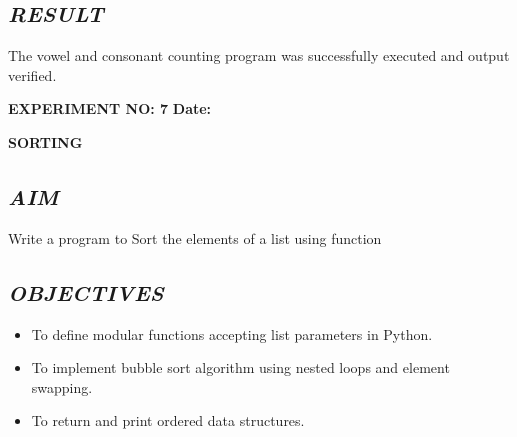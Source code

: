 \documentclass[11pt,a4paper]{article}
\begin{document}
\subsection*{\textit{RESULT}}
The vowel and consonant counting program was successfully executed and output verified.

\newpage

\noindent
\textbf{\large EXPERIMENT NO: 7} \hfill \textbf{\large Date: \underline{\hspace{3cm}}}

\vspace{0.2cm}
\begin{center}
{\Huge \textbf{\textcolor{navyblue}{SORTING}}}
\end{center}
\vspace{0.3cm}

\subsection*{\textit{AIM}}
Write a program to Sort the elements of a list using function

\subsection*{\textit{OBJECTIVES}}
\begin{itemize}
  \item To define modular functions accepting list parameters in Python.
  \item To implement bubble sort algorithm using nested loops and element swapping.
  \item To return and print ordered data structures.
\end{itemize}
\end{document}
